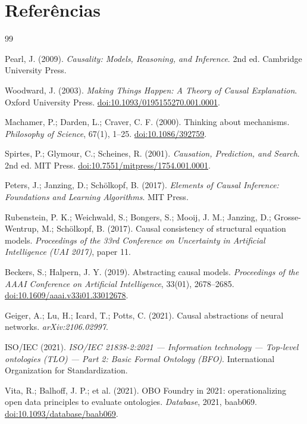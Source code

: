\documentclass[11pt,a4paper]{article}
\begin{document}
\section{Referências}

\begin{thebibliography}{99}

Pearl, J. (2009).
\emph{Causality: Models, Reasoning, and Inference}.
2nd ed. Cambridge University Press.

Woodward, J. (2003).
\emph{Making Things Happen: A Theory of Causal Explanation}.
Oxford University Press.
\href{https://doi.org/10.1093/0195155270.001.0001}{doi:10.1093/0195155270.001.0001}.

Machamer, P.; Darden, L.; Craver, C. F. (2000).
Thinking about mechanisms.
\emph{Philosophy of Science}, 67(1), 1--25.
\href{https://doi.org/10.1086/392759}{doi:10.1086/392759}.

Spirtes, P.; Glymour, C.; Scheines, R. (2001).
\emph{Causation, Prediction, and Search}.
2nd ed. MIT Press.
\href{https://doi.org/10.7551/mitpress/1754.001.0001}{doi:10.7551/mitpress/1754.001.0001}.

Peters, J.; Janzing, D.; Schölkopf, B. (2017).
\emph{Elements of Causal Inference: Foundations and Learning Algorithms}.
MIT Press.

Rubenstein, P. K.; Weichwald, S.; Bongers, S.; Mooij, J. M.; Janzing, D.;
Grosse-Wentrup, M.; Schölkopf, B. (2017).
Causal consistency of structural equation models.
\emph{Proceedings of the 33rd Conference on Uncertainty in Artificial Intelligence
(UAI 2017)}, paper 11.

Beckers, S.; Halpern, J. Y. (2019).
Abstracting causal models.
\emph{Proceedings of the AAAI Conference on Artificial Intelligence}, 33(01),
2678--2685.
\href{https://doi.org/10.1609/aaai.v33i01.33012678}{doi:10.1609/aaai.v33i01.33012678}.

Geiger, A.; Lu, H.; Icard, T.; Potts, C. (2021).
Causal abstractions of neural networks.
\emph{arXiv:2106.02997}.

ISO/IEC (2021).
\emph{ISO/IEC 21838-2:2021 — Information technology — Top-level ontologies (TLO) —
Part 2: Basic Formal Ontology (BFO)}.
International Organization for Standardization.

Vita, R.; Balhoff, J. P.; et al. (2021).
OBO Foundry in 2021: operationalizing open data principles to evaluate ontologies.
\emph{Database}, 2021, baab069.
\href{https://doi.org/10.1093/database/baab069}{doi:10.1093/database/baab069}.

\end{thebibliography}
\end{document}
